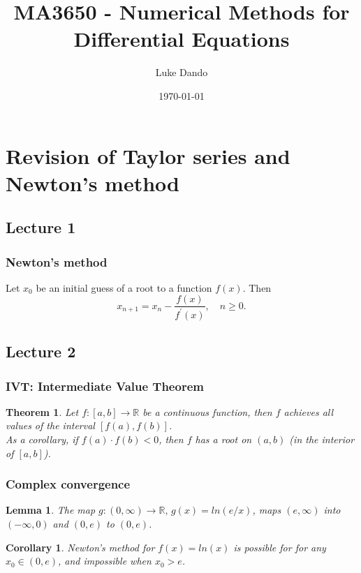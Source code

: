\documentclass{article}
\title{MA3650 - Numerical Methods for Differential Equations}
\author{Luke Dando}
\date{\today}
\newtheorem{theorem}{Theorem}
\newtheorem{lemma}{Lemma}
\newtheorem{corollary}{Corollary}
\begin{document}
\maketitle

\tableofcontents

\section{Revision of Taylor series and Newton's method}
\subsection{Lecture 1}
\subsubsection{Newton's method}
Let $x_0$ be an initial guess of a root to a function $f(x)$. Then
\begin{equation}
    x_{n+1} = x_n - \frac{f(x)}{f^\prime(x)},\quad n\geq0. \label{eq:newton}
\end{equation}

\subsection{Lecture 2}
\subsubsection{IVT: Intermediate Value Theorem}
\begin{theorem}
Let $f:[a,b]\to \mathbb{R}$ be a continuous function, then $f$ achieves all values of the interval $[f(a),f(b)]$.\\
As a corollary, if $f(a)\cdot f(b)<0$, then $f$ has a root on $(a,b)$ (in the interior of $[a,b]$).
\end{theorem}
\subsubsection{Complex convergence}
\begin{lemma}
    The map $g:(0,\infty)\to\mathbb{R},\,g(x) = ln(e/x)$, maps $(e,\infty)$ into $(-\infty, 0)$ and $(0, e)$
to $(0, e)$.
\end{lemma}
\begin{corollary}
    Newton's method for $f(x) = ln(x)$ is possible for for any $x_0\in(0,e)$, and impossible when $x_0>e$.
\end{corollary}
\end{document}
